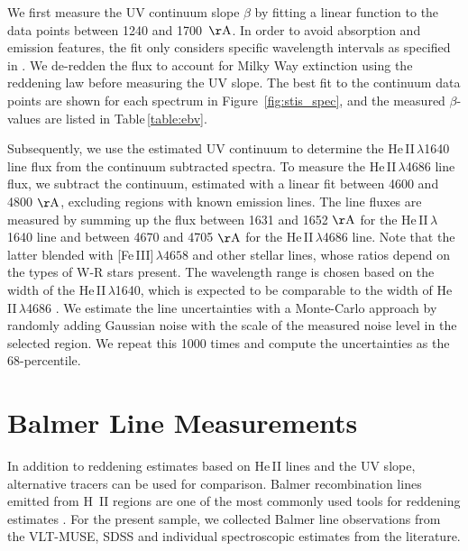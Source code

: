 \documentclass[linenumbers]{aastex63}
\begin{document}
We first measure the UV continuum slope $\beta$ by fitting a linear function to the data points between 1240 and 1700~${\rm \AA}$. In order to avoid absorption and emission features, the fit only considers specific wavelength intervals as specified in \citet{calzetti_dust_1994}. 
We de-redden the flux to account for Milky Way extinction using the \cite{cardelli_relationship_1989} reddening law before measuring the UV slope.
The best fit to the continuum data points are shown for each spectrum in Figure~\ref{fig:stis_spec}, and the measured $\beta$-values are listed in Table\,\ref{table:ebv}. 

Subsequently, we use the estimated UV continuum to determine the He\,II\,$\lambda$1640 line flux from the continuum subtracted spectra. To measure the He\,II\,$\lambda$4686 line flux, we subtract the continuum, estimated with a linear fit between 4600 and 4800 ${\rm \AA}$, excluding regions with known emission lines. 
The line fluxes are measured by summing up the flux between 1631 and 1652 ${\rm \AA}$ for the He\,II\,$\lambda$1640 line and between 4670 and 4705 ${\rm \AA}$ for the He\,II\,$\lambda$4686 line. Note that the latter blended with [Fe\,III]\,$\lambda4658$ and other stellar lines, whose ratios depend on the types of W-R stars present. The wavelength range is chosen based on the width of the He\,II\,$\lambda$1640, which is expected to be comparable to the width of He\,II\,$\lambda$4686 \citep{leitherer_he_2019,hillier_empirical_1987}.
We estimate the line uncertainties with a Monte-Carlo approach by randomly adding Gaussian noise with the scale of the measured noise level in the selected region. We repeat this 1000 times and compute the uncertainties as the 68-percentile.


\section{Balmer Line Measurements}\label{sect:balmer_line}
In addition to reddening estimates based on He\,II lines and the UV slope, alternative tracers can be used for comparison. Balmer recombination lines emitted from H~II regions are one of the most commonly used tools for reddening estimates \citep[e.g.][]{dominguez_dust_2013,momcheva_nebular_2013}. 
For the present sample, we collected Balmer line observations from the VLT-MUSE, SDSS and individual spectroscopic estimates from the literature.
\end{document}
